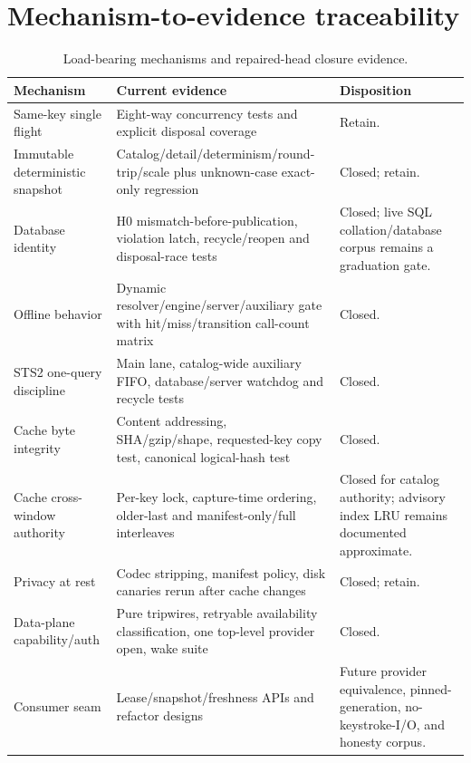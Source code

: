 \documentclass[11pt]{article}
\begin{document}
\section{Mechanism-to-evidence traceability}

\begin{table}[H]
\centering
\small
\caption{Load-bearing mechanisms and repaired-head closure evidence.}
\label{tab:traceability}
\begin{tabularx}{\textwidth}{@{}p{}p{}X@{}}
\toprule
\textbf{Mechanism} & \textbf{Current evidence} & \textbf{Disposition}\\
\midrule
Same-key single flight & Eight-way concurrency tests and explicit disposal coverage & Retain.\\
Immutable deterministic snapshot & Catalog/detail/determinism/round-trip/scale plus unknown-case exact-only regression & Closed; retain.\\
Database identity & H0 mismatch-before-publication, violation latch, recycle/reopen and disposal-race tests & Closed; live SQL collation/database corpus remains a graduation gate.\\
Offline behavior & Dynamic resolver/engine/server/auxiliary gate with hit/miss/transition call-count matrix & Closed.\\
STS2 one-query discipline & Main lane, catalog-wide auxiliary FIFO, database/server watchdog and recycle tests & Closed.\\
Cache byte integrity & Content addressing, SHA/gzip/shape, requested-key copy test, canonical logical-hash test & Closed.\\
Cache cross-window authority & Per-key lock, capture-time ordering, older-last and manifest-only/full interleaves & Closed for catalog authority; advisory index LRU remains documented approximate.\\
Privacy at rest & Codec stripping, manifest policy, disk canaries rerun after cache changes & Closed; retain.\\
Data-plane capability/auth & Pure tripwires, retryable availability classification, one top-level provider open, wake suite & Closed.\\
Consumer seam & Lease/snapshot/freshness APIs and refactor designs & Future provider equivalence, pinned-generation, no-keystroke-I/O, and honesty corpus.\\
\bottomrule
\end{tabularx}
\end{table}
\end{document}

